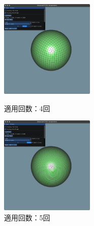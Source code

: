\documentclass[a4paper,10pt,uplatex,dvipdfmx]{jsarticle}
\begin{document}
\begin{figure}[htbp]
  \begin{minipage}{0.33\hsize}
    \begin{center}
      \includegraphics[width=45mm]{img/catmull-cube-4.png}
      \caption{適用回数：4回}
    \end{center}
  \end{minipage}
  \begin{minipage}{0.33\hsize}
    \begin{center}
      \includegraphics[width=45mm]{img/catmull-cube-5.png}
      \caption{適用回数：5回}
    \end{center}
  \end{minipage}
\end{figure}
\end{document}
